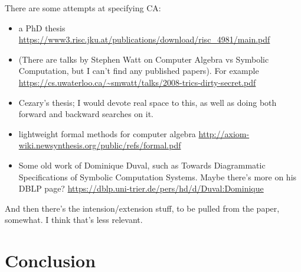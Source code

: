 \documentclass[fleqn]{llncs}
\begin{document}
There are some attempts at specifying CA:
\begin{itemize}
\item a PhD thesis 
\url{https://www3.risc.jku.at/publications/download/risc_4981/main.pdf}
\item (There are talks by Stephen Watt on Computer Algebra vs Symbolic
Computation, but I can't find any published papers). For example
\url{https://cs.uwaterloo.ca/~smwatt/talks/2008-trics-dirty-secret.pdf}
\item Cezary's thesis; I would devote real space to this, as well as doing
both forward and backward searches on it.
\item lightweight formal methods for computer algebra
\url{http://axiom-wiki.newsynthesis.org/public/refs/formal.pdf}
\item Some old work of Dominique Duval, such as
Towards Diagrammatic Specifications of Symbolic Computation Systems.
Maybe there's more on his DBLP page?
\url{https://dblp.uni-trier.de/pers/hd/d/Duval:Dominique}
\end{itemize}

And then there's the intension/extension stuff, to be pulled from
the {\churchuqe} paper, somewhat.  I think that's less relevant.
\section{Conclusion}




\setcounter{tocdepth}{1}
\listoftodos
\setcounter{tocdepth}{0}
\end{document}

